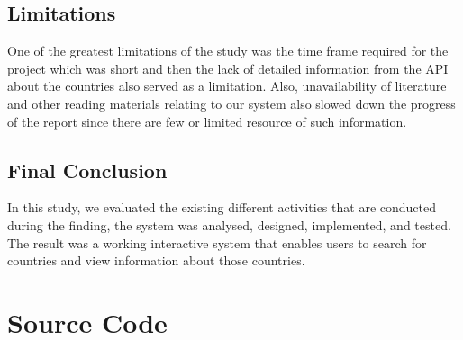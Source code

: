 \documentclass[twoside, a4paper, 12pt]{report}
\begin{document}
\section{Limitations}
One of the greatest limitations of the study was the time frame required for the project which was short and then the lack of detailed information from the API about the countries also served as a limitation. Also, unavailability of literature and other reading materials relating to our system also slowed down the progress of the report since there are few or limited resource of such information.

\section{Final Conclusion}
In this study, we evaluated the existing different activities that are conducted during the finding, the system was analysed, designed, implemented, and tested. The result was a working interactive system that enables users to search for countries and view information about those countries.

\appendix
\chapter{Source Code}
\end{document}
